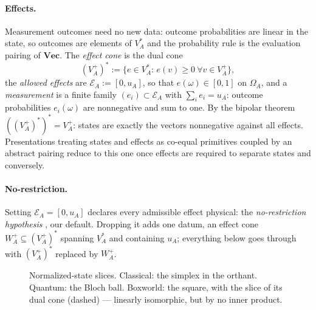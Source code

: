 \documentclass[prl,aps,10pt,superscriptaddress, floatfix]{revtex4-2}
\begin{document}
\paragraph{Effects.}
Measurement outcomes need no new data: outcome probabilities are linear in the state, so outcomes are elements of $V_A^*$ and the probability rule is the evaluation pairing of $\mathbf{Vec}$. The \emph{effect cone} is the dual cone
\[
(V_A^+)^*:=\{e\in V_A^*:\,e(v)\ge0\ \forall v\in V_A^+\},
\]
the \emph{allowed effects} are $\mathcal E_A:=[0,u_A]$, so that $e(\omega)\in[0,1]$ on $\Omega_A$, and a \emph{measurement} is a finite family $(e_i)\subset\mathcal E_A$ with $\sum_ie_i=u_A$: outcome probabilities $e_i(\omega)$ are nonnegative and sum to one. By the bipolar theorem $((V_A^+)^*)^*=V_A^+$: states are exactly the vectors nonnegative against all effects. Presentations treating states and effects as co-equal primitives coupled by an abstract pairing reduce to this one once effects are required to separate states and conversely.

\paragraph{No-restriction.}
Setting $\mathcal E_A=[0,u_A]$ declares every admissible effect physical: the \emph{no-restriction hypothesis} \cite{ChiribellaDArianoPerinotti2010}, our default. Dropping it \cite{JanottaLal2013} adds one datum, an effect cone $W_A^+\subseteq(V_A^+)^*$ spanning $V_A^*$ and containing $u_A$; everything below goes through with $(V_A^+)^*$ replaced by $W_A^+$.

\begin{figure}[t]
\centering
{}
\caption{Normalized-state slices. Classical: the simplex in the orthant. Quantum: the Bloch ball. Boxworld: the square, with the slice of its dual cone (dashed) --- linearly isomorphic, but by no inner product.}
\label{fig:examples}
\end{figure}
\end{document}
